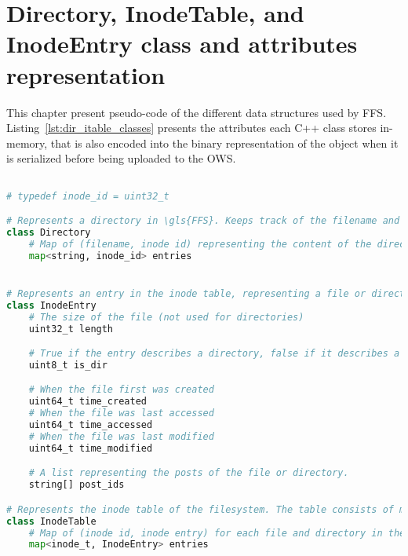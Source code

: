 \chapter{Directory, InodeTable, and InodeEntry class and attributes representation}
This chapter present \mbox{pseudo-code} of the different data structures used by \gls{FFS}. Listing~\ref{lst:dir_itable_classes} presents the attributes each C++ class stores \mbox{in-memory}, that is also encoded into the binary representation of the object when it is serialized before being uploaded to the \gls{OWS}.

\label{app:inode_dir_code}
\begin{lstlisting}[language=python, caption={The attributes classes representing directories and the inode table in \gls{FFS}}, label=lst:dir_itable_classes,breaklines=true]

# typedef inode_id = uint32_t

# Represents a directory in \gls{FFS}. Keeps track of the filename and inode of each file
class Directory
	# Map of (filename, inode id) representing the content of the directory
	map<string, inode_id> entries


# Represents an entry in the inode table, representing a file or directory
class InodeEntry
	# The size of the file (not used for directories) 
	uint32_t length

	# True if the entry describes a directory, false if it describes a file
	uint8_t is_dir

	# When the file first was created
	uint64_t time_created
	# When the file was last accessed
	uint64_t time_accessed
	# When the file was last modified
	uint64_t time_modified

	# A list representing the posts of the file or directory. 
	string[] post_ids

# Represents the inode table of the filesystem. The table consists of multiple inode entries
class InodeTable
	# Map of (inode id, inode entry) for each file and directory in the filesystem
	map<inode_t, InodeEntry> entries

\end{lstlisting}